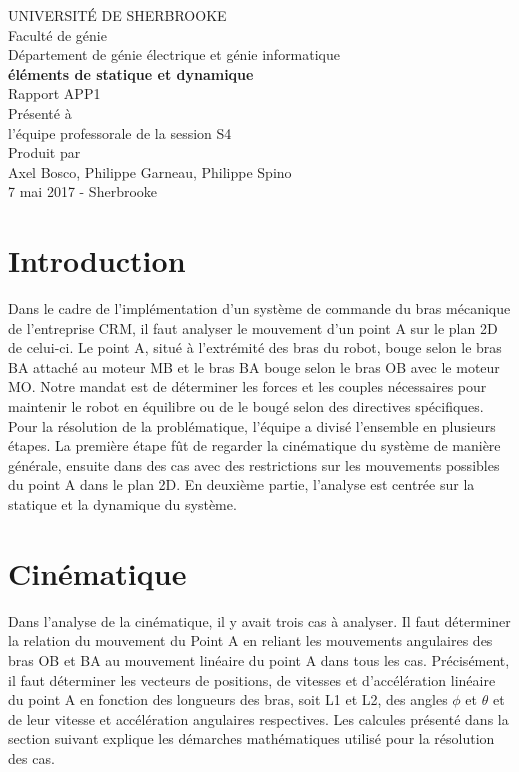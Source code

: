 \documentclass{article}
\begin{document}
\begin{titlepage}   
	\large{
		\begin{center}
			UNIVERSITÉ DE SHERBROOKE\\Faculté de génie\\
			Département de génie électrique et génie informatique\\
			\vspace{3cm}
			{\LARGE\textbf{éléments de statique et dynamique}}\\
			\vspace{2cm}
			\LARGE{Rapport APP1}\\
			\vspace{2cm}
			Présenté à\\l'équipe professorale de la session S4\\
			\vspace{2cm}
			Produit par\\Axel Bosco, Philippe Garneau, Philippe Spino\\
			\vspace{1cm}
			\vfill{7 mai 2017 - Sherbrooke}
		\end{center}
	}
\end{titlepage}
\newpage
\tableofcontents

\newpage
\section{Introduction}
Dans le cadre de l’implémentation d’un système de commande du bras mécanique de l’entreprise CRM, il faut analyser le mouvement d’un point A sur le plan 2D de celui-ci. Le point A, situé à l’extrémité des bras du robot, bouge selon le bras BA attaché au moteur MB et le bras BA bouge selon le bras OB avec le moteur MO. Notre mandat est de déterminer les forces et les couples nécessaires pour maintenir le robot en équilibre ou de le bougé selon des directives spécifiques. Pour la résolution de la problématique, l’équipe a divisé l’ensemble en plusieurs étapes. La première étape fût de regarder la cinématique du système de manière générale, ensuite dans des cas avec des restrictions sur les mouvements possibles du point A dans le plan 2D. En deuxième partie, l’analyse est centrée sur la statique et la dynamique du système. 

\section{Cinématique}
Dans l'analyse de la cinématique, il y avait trois cas à analyser. Il faut déterminer la relation du mouvement du Point A en reliant les mouvements angulaires des bras OB et BA au mouvement linéaire du point A dans tous les cas. Précisément, il faut déterminer les vecteurs de positions, de vitesses et d’accélération linéaire du point A en fonction des longueurs des bras, soit L1 et L2, des angles $\phi$ et $\theta$ et de leur vitesse et accélération angulaires respectives.
Les calcules présenté dans la section suivant explique les démarches mathématiques utilisé pour la résolution des cas.
\end{document}
